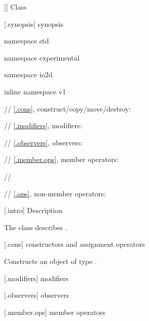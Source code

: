  [] {Class \tcode{}}

 [.synopsis] {\tcode{} synopsis}

\begin{codeblock}
namespace std { namespace experimental { namespace io2d { inline namespace v1 {
    // \ref{.cons}, construct/copy/move/destroy:

    // \ref{.modifiers}, modifiers:
    
    // \ref{.observers}, observers:
    
    // \ref{.member.ops}, member operators:
    
// \expos
  
  // \ref{.ops}, non-member operators:
} } } }
\end{codeblock}

 [.intro] {\tcode{} Description}

\pnum
\indexlibrary{\idxcode{}}
The class \tcode{} describes .

 [.cons] {\tcode{} constructors and assignment operators}

\begin{itemdecl}
\end{itemdecl}
\begin{itemdescr}
	\pnum
	\effects
	Constructs an object of type \tcode{}.
	
	\pnum
	\postconditions
	
\end{itemdescr}

 [.modifiers] {\tcode{} modifiers}

\indexlibrary{\idxcode{}!\idxcode{}}
\indexlibrary{\idxcode{}!\idxcode{}}
\begin{itemdecl}
\end{itemdecl}
\begin{itemdescr}
	\pnum
	\postconditions
	
\end{itemdescr}

 [.observers] {\tcode{} observers}

\indexlibrary{\idxcode{}!\idxcode{}}
\indexlibrary{\idxcode{}!\idxcode{}}
\begin{itemdecl}
\end{itemdecl}
\begin{itemdescr}
	\pnum
	\returns

\end{itemdescr}

 [.member.ops] {\tcode{} member operators}


